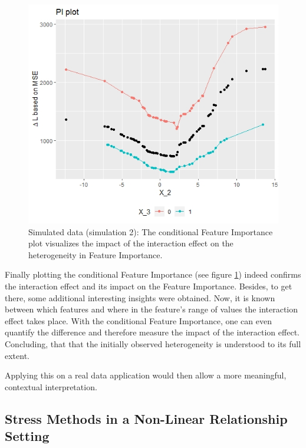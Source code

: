 \documentclass[
]{krantz}
\begin{document}
\begin{figure}

{\centering \includegraphics[width=0.99\linewidth]{images/03-7-6} 

}

\caption{Simulated data (simulation 2): The conditional Feature Importance plot visualizes the impact of the interaction effect on the heterogeneity in Feature Importance.}\label{fig:fig6}
\end{figure}

Finally plotting the conditional Feature Importance (see figure \ref{fig:fig6}) indeed confirms the interaction effect and its impact on the Feature Importance. Besides, to get there, some additional interesting insights were obtained. Now, it is known between which features and where in the feature's range of values the interaction effect takes place. With the conditional Feature Importance, one can even quantify the difference and therefore measure the impact of the interaction effect. Concluding, that that the initially observed heterogeneity is understood to its full extent.

Applying this on a real data application would then allow a more meaningful, contextual interpretation.

\hypertarget{ch323}{%
\subsection{Stress Methods in a Non-Linear Relationship Setting}\label{ch323}}
\end{document}
